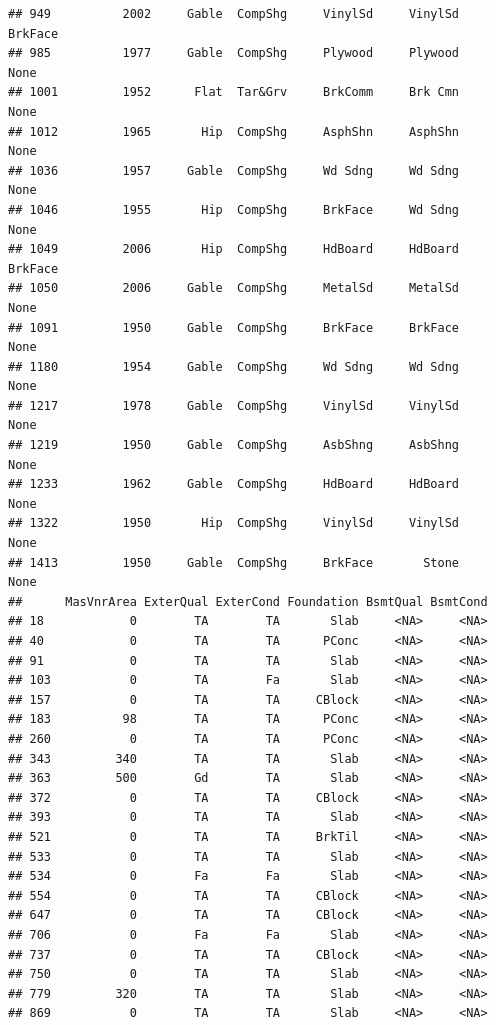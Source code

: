 \documentclass[]{article}
\begin{document}
\begin{verbatim}
## 949          2002     Gable  CompShg     VinylSd     VinylSd    BrkFace
## 985          1977     Gable  CompShg     Plywood     Plywood       None
## 1001         1952      Flat  Tar&Grv     BrkComm     Brk Cmn       None
## 1012         1965       Hip  CompShg     AsphShn     AsphShn       None
## 1036         1957     Gable  CompShg     Wd Sdng     Wd Sdng       None
## 1046         1955       Hip  CompShg     BrkFace     Wd Sdng       None
## 1049         2006       Hip  CompShg     HdBoard     HdBoard    BrkFace
## 1050         2006     Gable  CompShg     MetalSd     MetalSd       None
## 1091         1950     Gable  CompShg     BrkFace     BrkFace       None
## 1180         1954     Gable  CompShg     Wd Sdng     Wd Sdng       None
## 1217         1978     Gable  CompShg     VinylSd     VinylSd       None
## 1219         1950     Gable  CompShg     AsbShng     AsbShng       None
## 1233         1962     Gable  CompShg     HdBoard     HdBoard       None
## 1322         1950       Hip  CompShg     VinylSd     VinylSd       None
## 1413         1950     Gable  CompShg     BrkFace       Stone       None
##      MasVnrArea ExterQual ExterCond Foundation BsmtQual BsmtCond
## 18            0        TA        TA       Slab     <NA>     <NA>
## 40            0        TA        TA      PConc     <NA>     <NA>
## 91            0        TA        TA       Slab     <NA>     <NA>
## 103           0        TA        Fa       Slab     <NA>     <NA>
## 157           0        TA        TA     CBlock     <NA>     <NA>
## 183          98        TA        TA      PConc     <NA>     <NA>
## 260           0        TA        TA      PConc     <NA>     <NA>
## 343         340        TA        TA       Slab     <NA>     <NA>
## 363         500        Gd        TA       Slab     <NA>     <NA>
## 372           0        TA        TA     CBlock     <NA>     <NA>
## 393           0        TA        TA       Slab     <NA>     <NA>
## 521           0        TA        TA     BrkTil     <NA>     <NA>
## 533           0        TA        TA       Slab     <NA>     <NA>
## 534           0        Fa        Fa       Slab     <NA>     <NA>
## 554           0        TA        TA     CBlock     <NA>     <NA>
## 647           0        TA        TA     CBlock     <NA>     <NA>
## 706           0        Fa        Fa       Slab     <NA>     <NA>
## 737           0        TA        TA     CBlock     <NA>     <NA>
## 750           0        TA        TA       Slab     <NA>     <NA>
## 779         320        TA        TA       Slab     <NA>     <NA>
## 869           0        TA        TA       Slab     <NA>     <NA>

\end{verbatim}
\end{document}
